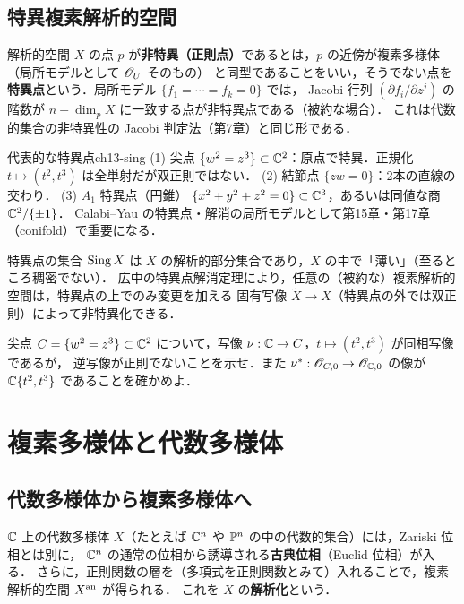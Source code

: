 \subsection{特異複素解析的空間}

解析的空間 $X$ の点 $p$ が\textbf{非特異（正則点）}であるとは，$p$ の近傍が複素多様体（局所モデルとして $\mathscr{O}_U$ そのもの）
と同型であることをいい，そうでない点を\textbf{特異点}という．局所モデル $\{f_1=\cdots=f_k=0\}$ では，
Jacobi 行列 $(\partial f_i/\partial z^j)$ の階数が $n-\dim_pX$ に一致する点が非特異点である（被約な場合）．
これは代数的集合の非特異性の Jacobi 判定法（第7章）と同じ形である．

\begin{myex}{代表的な特異点}{ch13-sing}
(1) 尖点 $\{w^2=z^3\}\subset\mathbb{C}^2$：原点で特異．正規化 $t\mapsto (t^2,t^3)$ は全単射だが双正則ではない．
(2) 結節点 $\{zw=0\}$：2本の直線の交わり．
(3) $A_1$ 特異点（円錐） $\{x^2+y^2+z^2=0\}\subset\mathbb{C}^3$，あるいは同値な商 $\mathbb{C}^2/\{\pm1\}$．
Calabi--Yau の特異点・解消の局所モデルとして第15章・第17章（conifold）で重要になる．
\end{myex}

特異点の集合 $\operatorname{Sing} X$ は $X$ の解析的部分集合であり，$X$ の中で「薄い」（至るところ稠密でない）．
広中の特異点解消定理により，任意の（被約な）複素解析的空間は，特異点の上でのみ変更を加える
固有写像 $\tilde X\to X$（特異点の外では双正則）によって非特異化できる．

尖点 $C=\{w^2=z^3\}\subset\mathbb{C}^2$ について，写像 $\nu:\mathbb{C}\to C$，$t\mapsto(t^2,t^3)$ が同相写像であるが，
逆写像が正則でないことを示せ．また $\nu^*:\mathscr{O}_{C,0}\to\mathscr{O}_{\mathbb{C},0}$ の像が $\mathbb{C}\{t^2,t^3\}$ であることを確かめよ．

\section{複素多様体と代数多様体}

\subsection{代数多様体から複素多様体へ}

$\mathbb{C}$ 上の代数多様体 $X$（たとえば $\mathbb{C}^n$ や $\mathbb{P}^n$ の中の代数的集合）には，Zariski 位相とは別に，
$\mathbb{C}^n$ の通常の位相から誘導される\textbf{古典位相}（Euclid 位相）が入る．
さらに，正則関数の層を（多項式を正則関数とみて）入れることで，複素解析的空間 $X^{\rm an}$ が得られる．
これを $X$ の\textbf{解析化}という．

